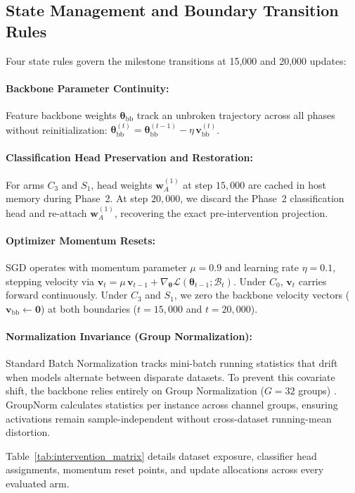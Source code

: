 \documentclass[sn-mathphys,Numbered]{sn-jnl}
\begin{document}
\subsection{State Management and Boundary Transition Rules}\label{subsec:schedule_transitions}

Four state rules govern the milestone transitions at 15,000 and 20,000 updates:
\paragraph{Backbone Parameter Continuity:} Feature backbone weights $\bm{\theta}_{\mathrm{bb}}$ track an unbroken trajectory across all phases without reinitialization: $\bm{\theta}_{\mathrm{bb}}^{(t)} = \bm{\theta}_{\mathrm{bb}}^{(t-1)} - \eta \, \bm{v}_{\mathrm{bb}}^{(t)}$.
\paragraph{Classification Head Preservation and Restoration:} For arms $C_3$ and $S_1$, head weights $\bm{w}_A^{(1)}$ at step $15{,}000$ are cached in host memory during Phase~2. At step $20{,}000$, we discard the Phase~2 classification head and re-attach $\bm{w}_A^{(1)}$, recovering the exact pre-intervention projection.
\paragraph{Optimizer Momentum Resets:} SGD operates with momentum parameter $\mu = 0.9$ and learning rate $\eta = 0.1$, stepping velocity via $\bm{v}_t = \mu \, \bm{v}_{t-1} + \nabla_{\!\bm{\theta}} \mathcal{L}(\bm{\theta}_{t-1}; \mathcal{B}_t)$. Under $C_0$, $\bm{v}_t$ carries forward continuously. Under $C_3$ and $S_1$, we zero the backbone velocity vectors ($\bm{v}_{\mathrm{bb}} \leftarrow \mathbf{0}$) at both boundaries ($t = 15{,}000$ and $t = 20{,}000$).
\paragraph{Normalization Invariance (Group Normalization):} Standard Batch Normalization tracks mini-batch running statistics that drift when models alternate between disparate datasets. To prevent this covariate shift, the backbone relies entirely on Group Normalization ($G = 32$ groups) \cite{wu2018groupnorm}. GroupNorm calculates statistics per instance across channel groups, ensuring activations remain sample-independent without cross-dataset running-mean distortion.

Table~\ref{tab:intervention_matrix} details dataset exposure, classifier head assignments, momentum reset points, and update allocations across every evaluated arm.
\end{document}

